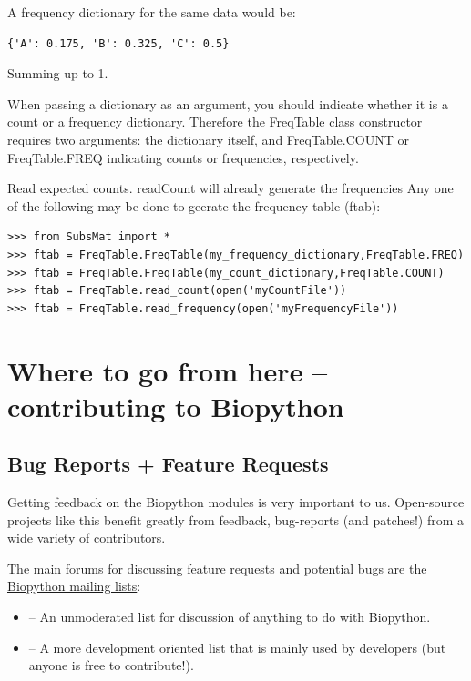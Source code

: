 \documentclass{report}
\begin{document}
\begin{enumerate}
 A frequency dictionary for the same data would be:

\begin{verbatim}
{'A': 0.175, 'B': 0.325, 'C': 0.5}
\end{verbatim}

Summing up to 1.

When passing a dictionary as an argument, you should indicate whether it is a count or a frequency dictionary. Therefore the FreqTable class constructor requires two arguments: the dictionary itself, and FreqTable.COUNT or FreqTable.FREQ indicating counts or frequencies, respectively.

Read expected counts. readCount will already generate the frequencies
Any one of the following may be done to geerate the frequency table (ftab):

\begin{verbatim}
>>> from SubsMat import *
>>> ftab = FreqTable.FreqTable(my_frequency_dictionary,FreqTable.FREQ)
>>> ftab = FreqTable.FreqTable(my_count_dictionary,FreqTable.COUNT)
>>> ftab = FreqTable.read_count(open('myCountFile'))
>>> ftab = FreqTable.read_frequency(open('myFrequencyFile'))
\end{verbatim}

\end{enumerate}

\chapter{Where to go from here -- contributing to Biopython}

\section{Bug Reports + Feature Requests}

Getting feedback on the Biopython modules is very important to us. Open-source projects like this benefit greatly from feedback, bug-reports (and patches!) from a wide variety of contributors.

The main forums for discussing feature requests and potential bugs are the
\href{http://biopython.org/wiki/Mailing_lists}{Biopython mailing lists}:

\begin{itemize}
  \item {} -- An unmoderated list for discussion of anything to do with Biopython.

  \item {} -- A more development oriented list that is mainly used by developers (but anyone is free to contribute!).
\end{itemize}
\end{document}
